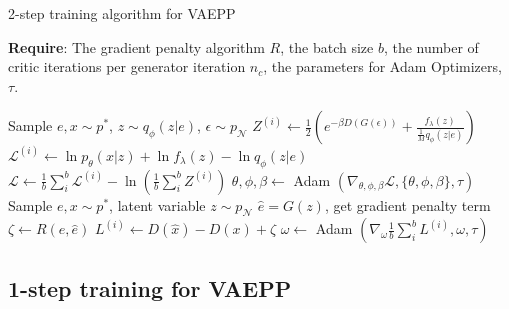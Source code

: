 \begin{algorithm}[tb]
\caption{2-step training algorithm for VAEPP}
\label{alg:vaepp}
\textbf{Require}: The gradient penalty algorithm $R$, the batch size $b$, the number of critic iterations per generator iteration $n_c$, the parameters for Adam Optimizers, $\tau$. 

\begin{algorithmic}[1] %
\STATE Sample $e, x \sim p^*$, $z \sim q_\phi(z|e)$, $\epsilon \sim p_\mathcal{N}$
\STATE $Z^{(i)} \gets \frac{1}{2}(e^{-\beta D(G(\epsilon))} + \frac{f_\lambda(z)}{\frac{1}{M} q_\phi(z|e)})$
\STATE $\mathcal{L}^{(i)} \gets \ln p_\theta(x|z) + \ln f_\lambda(z) - \ln q_\phi(z|e)$
\ENDFOR
\STATE $\mathcal{L} \gets \frac{1}{b}\sum_{i}^b \mathcal{L}^{(i)} - \ln (\frac{1}{b}\sum_{i}^b Z^{(i)})$
\STATE $\theta, \phi, \beta \gets $ Adam $(\nabla_{\theta, \phi, \beta} \mathcal{L}, \{\theta, \phi, \beta\}, \tau)$
\ENDFOR
{}
\STATE Sample $e, x \sim p^*$, latent variable $z \sim p_\mathcal{N}$
\STATE	$\hat{e} = G(z)$, get gradient penalty term $\zeta \gets R(e, \hat{e})$
\STATE $L^{(i)} \gets D(\hat{x}) - D(x) + \zeta$
\ENDFOR
\STATE $\omega \gets $ Adam $(\nabla_{\omega} \frac{1}{b}\sum_{i}^b L^{(i)}, \omega, \tau)$
\ENDWHILE
\end{algorithmic}
\end{algorithm}

\subsection{1-step training for VAEPP} \label{subsec:improve_of_vaepp}

